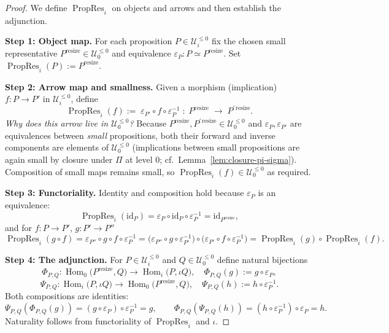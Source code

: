 \documentclass[a4paper,11pt]{article}
\newcommand{\resize}{\mathrm{resize}}
\DeclareMathOperator{\Hom}{Hom}
\begin{document}
\begin{proof}
We define $\operatorname{PropRes}_{i}$ on objects and arrows and then
establish the adjunction.

\smallskip
\textbf{Step 1: Object map.}
For each proposition
$P\in\mathcal U_{i}^{\le 0}$ fix the chosen
small representative $P^{\resize}\in\mathcal U_{0}^{\le 0}$ and
equivalence
$\varepsilon_{P}\colon P\simeq P^{\resize}$.
Set
$\operatorname{PropRes}_{i}(P):=P^{\resize}$.

\smallskip
\textbf{Step 2: Arrow map and smallness.}
Given a morphism (implication)  
$f\colon P\to P'$ in $\mathcal U_{i}^{\le 0}$, define
\[
  \operatorname{PropRes}_{i}(f)
    :=\;
    \varepsilon_{P'}\circ f\circ\varepsilon_{P}^{-1}
    \;:\;
    P^{\resize}\;\longrightarrow\;P^{\prime\,\resize}.
\]
\emph{Why does this arrow live in $\mathcal U_{0}^{\le 0}$?}  
Because
$P^{\resize},P^{\prime\,\resize}\in\mathcal U_{0}^{\le 0}$ and
$\varepsilon_{P},\varepsilon_{P'}$ are equivalences
between \emph{small} propositions, both their forward and inverse
components are elements of
$\mathcal U_{0}^{\le 0}$ (implications between small propositions are
again small by closure under $\Pi$ at level 0; cf.\
Lemma~\ref{lem:closure-pi-sigma}).
Composition of small maps remains small, so
$\operatorname{PropRes}_{i}(f)\in\mathcal U_{0}^{\le 0}$ as required.

\smallskip
\textbf{Step 3: Functoriality.}
Identity and composition hold because
$\varepsilon_{P}$ is an equivalence:
\[
  \operatorname{PropRes}_{i}(\mathrm{id}_{P})
  =\varepsilon_{P}\circ\mathrm{id}_{P}\circ\varepsilon_{P}^{-1}
  =\mathrm{id}_{P^{\resize}},
\]
and for $f\colon P\!\to\!P'$, $g\colon P'\!\to\!P''$
\[
  \operatorname{PropRes}_{i}(g\circ f)
  =\varepsilon_{P''}\circ g\circ f\circ\varepsilon_{P}^{-1}
  =\bigl(\varepsilon_{P''}\circ g\circ\varepsilon_{P'}^{-1}\bigr)
   \!\circ\!
   \bigl(\varepsilon_{P'}\circ f\circ\varepsilon_{P}^{-1}\bigr)
  =\operatorname{PropRes}_{i}(g)\circ\operatorname{PropRes}_{i}(f).
\]

\smallskip
\textbf{Step 4: The adjunction.}
For $P\in\mathcal U_{i}^{\le 0}$ and
$Q\in\mathcal U_{0}^{\le 0}$ define natural bijections
\[
  \Phi_{P,Q}\colon
    \Hom_{0}\!\bigl(P^{\resize},Q\bigr)
      \longrightarrow
    \Hom_{i}\!\bigl(P,\iota Q\bigr),
  \quad
  \Phi_{P,Q}(g):=g\circ\varepsilon_{P},
\]
\[
  \Psi_{P,Q}\colon
    \Hom_{i}\!\bigl(P,\iota Q\bigr)
      \longrightarrow
    \Hom_{0}\!\bigl(P^{\resize},Q\bigr),
  \quad
  \Psi_{P,Q}(h):=h\circ\varepsilon_{P}^{-1}.
\]
Both compositions are identities:
\[
  \Psi_{P,Q}(\Phi_{P,Q}(g))
    =(g\circ\varepsilon_{P})\circ\varepsilon_{P}^{-1}=g,\qquad
  \Phi_{P,Q}(\Psi_{P,Q}(h))
    =(h\circ\varepsilon_{P}^{-1})\circ\varepsilon_{P}=h.
\]
Naturality follows from functoriality of
$\operatorname{PropRes}_{i}$ and $\iota$.


\end{proof}
\end{document}
